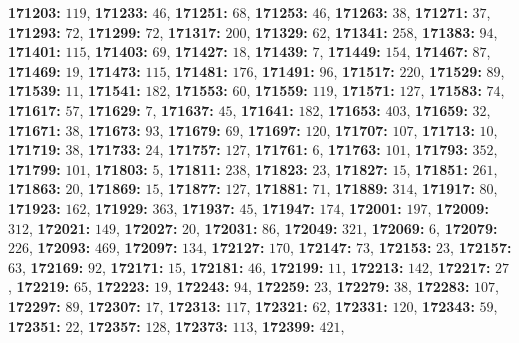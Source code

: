 \textsf{\bfseries 171203:} $119$, \textsf{\bfseries 171233:} $46$, \textsf{\bfseries 171251:} $68$, \textsf{\bfseries 171253:} $46$, \textsf{\bfseries 171263:} $38$, \textsf{\bfseries 171271:} $37$, \textsf{\bfseries 171293:} $72$, \textsf{\bfseries 171299:} $72$, \textsf{\bfseries 171317:} $200$, \textsf{\bfseries 171329:} $62$, \textsf{\bfseries 171341:} $258$, \textsf{\bfseries 171383:} $94$, \textsf{\bfseries 171401:} $115$, \textsf{\bfseries 171403:} $69$, \textsf{\bfseries 171427:} $18$, \textsf{\bfseries 171439:} $7$, \textsf{\bfseries 171449:} $154$, \textsf{\bfseries 171467:} $87$, \textsf{\bfseries 171469:} $19$, \textsf{\bfseries 171473:} $115$, \textsf{\bfseries 171481:} $176$, \textsf{\bfseries 171491:} $96$, \textsf{\bfseries 171517:} $220$, \textsf{\bfseries 171529:} $89$, \textsf{\bfseries 171539:} $11$, \textsf{\bfseries 171541:} $182$, \textsf{\bfseries 171553:} $60$, \textsf{\bfseries 171559:} $119$, \textsf{\bfseries 171571:} $127$, \textsf{\bfseries 171583:} $74$, \textsf{\bfseries 171617:} $57$, \textsf{\bfseries 171629:} $7$, \textsf{\bfseries 171637:} $45$, \textsf{\bfseries 171641:} $182$, \textsf{\bfseries 171653:} $403$, \textsf{\bfseries 171659:} $32$, \textsf{\bfseries 171671:} $38$, \textsf{\bfseries 171673:} $93$, \textsf{\bfseries 171679:} $69$, \textsf{\bfseries 171697:} $120$, \textsf{\bfseries 171707:} $107$, \textsf{\bfseries 171713:} $10$, \textsf{\bfseries 171719:} $38$, \textsf{\bfseries 171733:} $24$, \textsf{\bfseries 171757:} $127$, \textsf{\bfseries 171761:} $6$, \textsf{\bfseries 171763:} $101$, \textsf{\bfseries 171793:} $352$, \textsf{\bfseries 171799:} $101$, \textsf{\bfseries 171803:} $5$, \textsf{\bfseries 171811:} $238$, \textsf{\bfseries 171823:} $23$, \textsf{\bfseries 171827:} $15$, \textsf{\bfseries 171851:} $261$, \textsf{\bfseries 171863:} $20$, \textsf{\bfseries 171869:} $15$, \textsf{\bfseries 171877:} $127$, \textsf{\bfseries 171881:} $71$, \textsf{\bfseries 171889:} $314$, \textsf{\bfseries 171917:} $80$, \textsf{\bfseries 171923:} $162$, \textsf{\bfseries 171929:} $363$, \textsf{\bfseries 171937:} $45$, \textsf{\bfseries 171947:} $174$, \textsf{\bfseries 172001:} $197$, \textsf{\bfseries 172009:} $312$, \textsf{\bfseries 172021:} $149$, \textsf{\bfseries 172027:} $20$, \textsf{\bfseries 172031:} $86$, \textsf{\bfseries 172049:} $321$, \textsf{\bfseries 172069:} $6$, \textsf{\bfseries 172079:} $226$, \textsf{\bfseries 172093:} $469$, \textsf{\bfseries 172097:} $134$, \textsf{\bfseries 172127:} $170$, \textsf{\bfseries 172147:} $73$, \textsf{\bfseries 172153:} $23$, \textsf{\bfseries 172157:} $63$, \textsf{\bfseries 172169:} $92$, \textsf{\bfseries 172171:} $15$, \textsf{\bfseries 172181:} $46$, \textsf{\bfseries 172199:} $11$, \textsf{\bfseries 172213:} $142$, \textsf{\bfseries 172217:} $27$, \textsf{\bfseries 172219:} $65$, \textsf{\bfseries 172223:} $19$, \textsf{\bfseries 172243:} $94$, \textsf{\bfseries 172259:} $23$, \textsf{\bfseries 172279:} $38$, \textsf{\bfseries 172283:} $107$, \textsf{\bfseries 172297:} $89$, \textsf{\bfseries 172307:} $17$, \textsf{\bfseries 172313:} $117$, \textsf{\bfseries 172321:} $62$, \textsf{\bfseries 172331:} $120$, \textsf{\bfseries 172343:} $59$, \textsf{\bfseries 172351:} $22$, \textsf{\bfseries 172357:} $128$, \textsf{\bfseries 172373:} $113$, \textsf{\bfseries 172399:} $421$, 
